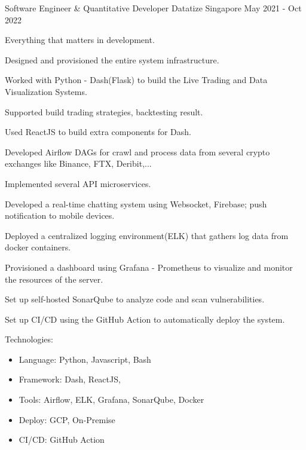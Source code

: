 \begin{cventries}
    
    \cventry
    {Software Engineer \& Quantitative Developer} %
    {Datatize} %
    {Singapore} %
    {May 2021 - Oct 2022} %
    {
      \begin{cvitems} %
        \item {Everything that matters in development.}
        \item {Designed and provisioned the entire system infrastructure.}
        \item {Worked with Python - Dash(Flask) to build the Live Trading and Data Visualization Systems.}
        \item {Supported build trading strategies, backtesting result.}
        \item {Used ReactJS to build extra components for Dash.}
        \item {Developed Airflow DAGs for crawl and process data from several crypto exchanges like Binance, FTX, Deribit,...}
        \item {Implemented several API microservices.}
        \item {Developed a real-time chatting system using Websocket, Firebase; push notification to mobile devices.}
        \item {Deployed a centralized logging environment(ELK) that gathers log data from docker containers.}
        \item {Provisioned a dashboard using Grafana - Prometheus to visualize and monitor the resources of the server.}
        \item {Set up self-hosted SonarQube to analyze code and scan vulnerabilities.}
        \item {Set up CI/CD using the GitHub Action to automatically deploy the system.}
        \item {Technologies:
          \begin{itemize}
            \item {Language: Python, Javascript, Bash}
            \item {Framework: Dash, ReactJS, }
            \item {Tools: Airflow, ELK, Grafana, SonarQube, Docker}
            \item {Deploy: GCP, On-Premise}
            \item {CI/CD: GitHub Action}
          \end{itemize}
        }
      \end{cvitems}
    }


\end{cventries}
